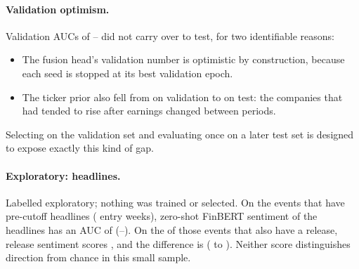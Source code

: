 \documentclass[11pt]{article}
\begin{document}
\paragraph{Validation optimism.} Validation AUCs of \valZs--\valHead{} did not carry over to test, for two
identifiable reasons:
\begin{itemize}
  \item The fusion head's validation number is optimistic by construction, because each seed is
  stopped at its best validation epoch.
  \item The ticker prior also fell from \valTick{} on validation to \testTick{} on test: the companies
  that had tended to rise after earnings changed between periods.
\end{itemize}
Selecting on the validation set and evaluating once on a later test set is designed to expose exactly
this kind of gap.

\paragraph{Exploratory: headlines.}\label{sec:explore} Labelled exploratory; nothing was trained or
selected. On the \explN{} events that have pre-cutoff headlines (\explWeeks{} entry weeks), zero-shot
FinBERT sentiment of the headlines has an AUC of \explAuc{} (\explLo--\explHi). On the \explBothN{} of
those events that also have a release, release sentiment scores \explDocAuc{}, and the difference is
\explDiff{} (\explDiffLo{} to \explDiffHi). Neither score distinguishes direction from chance in this
small sample.
\end{document}
